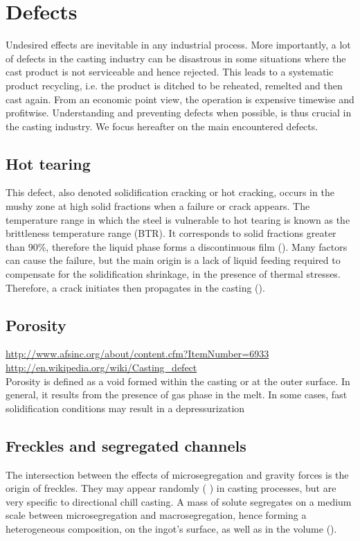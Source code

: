 \section*{Defects}
Undesired effects are inevitable in any industrial process. More importantly, a lot of defects in the casting industry can be disastrous in some situations where the cast product is not serviceable and hence rejected. This leads to a systematic product recycling, i.e. the product is ditched to be reheated, remelted and then cast again. From an economic point view, the operation is expensive timewise and profitwise. Understanding and preventing defects when possible, is thus crucial in the casting industry.
We focus hereafter on the main encountered defects.

\subsection*{Hot tearing}
This defect, also denoted solidification cracking or hot cracking, occurs in the mushy zone at high solid fractions when a failure
or crack appears. The temperature range in which the steel is vulnerable to hot tearing is known as the brittleness temperature range (BTR). It corresponds to solid fractions greater than \num{90}\%, therefore the liquid phase forms a discontinuous film (). Many factors can cause the failure, but the main origin is a lack of liquid feeding required to compensate for the solidification shrinkage, in the presence of thermal stresses. Therefore, a crack initiates then propagates in the casting (). 

\subsection*{Porosity}
\url{http://www.afsinc.org/about/content.cfm?ItemNumber=6933} \\
\url{http://en.wikipedia.org/wiki/Casting_defect} \\
Porosity is defined as a void formed within the casting or at the outer surface.
In general, it results from the presence of gas phase in the melt. In some cases, fast
solidification conditions may result in a depressurization 

\subsection*{Freckles and segregated channels} 
The intersection between the effects of microsegregation and gravity forces is the origin of freckles. They may appear 
randomly ( ) in casting processes, but are very specific to directional chill casting. A mass of solute 
segregates on a medium scale between microsegregation and macrosegregation, hence forming a heterogeneous composition, 
on the ingot's surface, as well as in the volume ().

